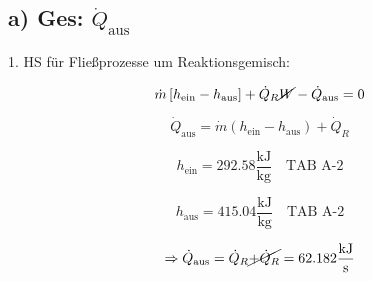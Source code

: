 \subsection*{a) Ges: $\dot{Q}_{\text{aus}}$}

1. HS für Fließprozesse um Reaktionsgemisch:

\[
\dot{m} \left[ h_{\text{ein}} - h_{\text{aus}} \right] + \dot{Q}_R \cancel{W} - \dot{Q}_{\text{aus}} = 0
\]

\[
\dot{Q}_{\text{aus}} = \dot{m} (h_{\text{ein}} - h_{\text{aus}}) + \dot{Q}_R
\]

\[
h_{\text{ein}} = 292.58 \frac{\text{kJ}}{\text{kg}} \quad \text{TAB A-2}
\]

\[
h_{\text{aus}} = 415.04 \frac{\text{kJ}}{\text{kg}} \quad \text{TAB A-2}
\]

\[
\Rightarrow \dot{Q}_{\text{aus}} = \dot{Q}_R \cancel{+ \dot{Q}_R} = 62.182 \frac{\text{kJ}}{\text{s}}
\]